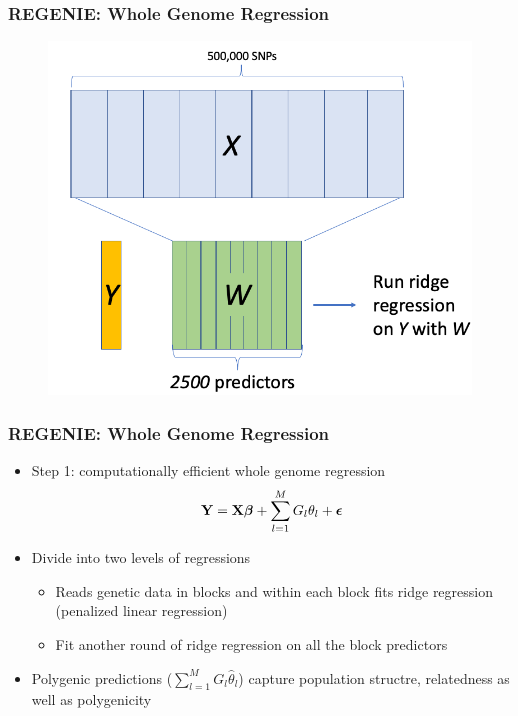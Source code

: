 \documentclass{beamer}
\newcommand{\bepsilon}{\mbox{\boldmath$\epsilon$}}
\begin{document}
\begin{frame}
	\frametitle{\bf  REGENIE: Whole Genome Regression}
	\vspace{-1em}
	\begin{figure}
		\includegraphics[scale=.35]{Figures/regenie_wgr3}
	\end{figure}
\end{frame}

\begin{frame}
	\frametitle{\bf  REGENIE: Whole Genome Regression}
	\begin{itemize}
		\item Step 1: computationally efficient whole genome regression
		$$ \mathbf{Y}= \mathbf{X}\boldsymbol{\beta} +  \sum_{l=1}^MG_l\theta_l + \bepsilon  $$
		\item Divide into two levels of regressions
		\begin{itemize}
			\item Reads genetic data in blocks and within each block fits ridge regression (penalized linear regression)
			\item Fit another round of ridge regression on all the block predictors
		\end{itemize}
		\item  Polygenic predictions ($\sum_{l=1}^MG_l\hat{\theta}_l $) capture population structre, relatedness as well as polygenicity
	\end{itemize}
\end{frame}
\end{document}
